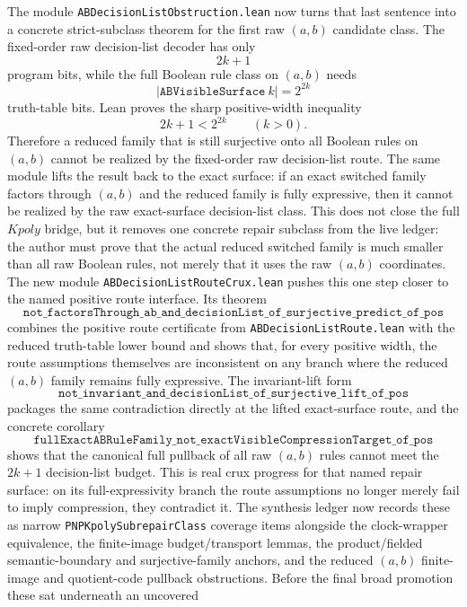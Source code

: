 \documentclass[11pt]{article}
\theoremstyle{remark}
\begin{document}
The module \texttt{ABDecisionListObstruction.lean} now turns that last sentence
into a concrete strict-subclass theorem for the first raw \((a,b)\) candidate
class.  The fixed-order raw decision-list decoder has only
\[
  2k+1
\]
program bits, while the full Boolean rule class on \((a,b)\) needs
\[
  |\texttt{ABVisibleSurface}\ k| = 2^{2k}
\]
truth-table bits.  Lean proves the sharp positive-width inequality
\[
  2k+1 < 2^{2k} \qquad (k>0).
\]
Therefore a reduced family that is still surjective onto all Boolean rules on
\((a,b)\) cannot be realized by the fixed-order raw decision-list route.  The
same module lifts the result back to the exact surface: if an exact switched
family factors through \((a,b)\) and the reduced family is fully expressive,
then it cannot be realized by the raw exact-surface decision-list class.  This
does not close the full \(Kpoly\) bridge, but it removes one concrete repair
subclass from the live ledger: the author must prove that the actual reduced
switched family is much smaller than all raw Boolean rules, not merely that it
uses the raw \((a,b)\) coordinates.
The new module \texttt{ABDecisionListRouteCrux.lean} pushes this one step
closer to the named positive route interface.  Its theorem
\[
  \texttt{not\_factorsThrough\_ab\_and\_decisionList\_of\_surjective\_predict\_of\_pos}
\]
combines the positive route certificate from
\texttt{ABDecisionListRoute.lean} with the reduced truth-table lower bound and
shows that, for every positive width, the route assumptions themselves are
inconsistent on any branch where the reduced \((a,b)\) family remains fully
expressive.  The invariant-lift form
\[
  \texttt{not\_invariant\_and\_decisionList\_of\_surjective\_lift\_of\_pos}
\]
packages the same contradiction directly at the lifted exact-surface route,
and the concrete corollary
\[
  \texttt{fullExactABRuleFamily\_not\_exactVisibleCompressionTarget\_of\_pos}
\]
shows that the canonical full pullback of all raw \((a,b)\) rules cannot meet
the \(2k+1\) decision-list budget.  This is real crux progress for that named
repair surface: on its full-expressivity branch the route assumptions no
longer merely fail to imply compression, they contradict it.
The synthesis ledger now records these as narrow
\texttt{PNPKpolySubrepairClass} coverage items alongside the clock-wrapper
equivalence, the finite-image budget/transport lemmas, the product/fielded
semantic-boundary and surjective-family anchors, and the reduced \((a,b)\)
finite-image and quotient-code pullback obstructions.  Before the final broad
promotion these sat underneath an uncovered
\end{document}
